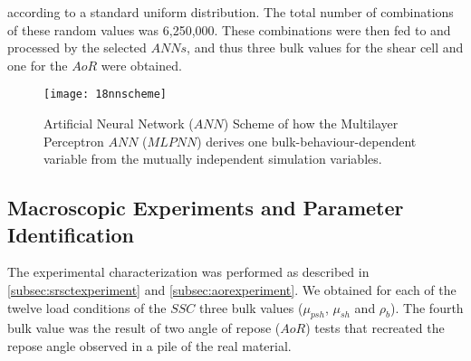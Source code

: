 \documentclass[review]{elsarticle}
\begin{document}
according to a standard uniform distribution.
The total number of combinations of these random values was 6,250,000.
These combinations were then fed to and processed by the selected
$ANNs$, and thus three bulk values for the shear
cell and one for the $AoR$ were obtained.
\begin{figure}[!htb] 
\centering 
\texttt{[image: 18nnscheme]} 
\caption[ANN Scheme]{Artificial Neural Network ($ANN$) Scheme
of how the Multilayer Perceptron $ANN$ ($MLPNN$) derives one
bulk-behaviour-dependent variable from the mutually independent simulation variables.}
\label{fig:18nnscheme} 
\end{figure}

\subsection{Macroscopic Experiments and Parameter Identification}
\label{subsec:macroscopicexperimentsparameteridentification}
The experimental characterization was performed as described in
\ref{subsec:srsctexperiment} and \ref{subsec:aorexperiment}. 
We obtained for each of the twelve load conditions of the $SSC$ three bulk
values ($\mu_{psh}$, $\mu_{sh}$ and $\rho_b$).
The fourth bulk value was the result of two angle of repose ($AoR$) tests that
recreated the repose angle observed in a pile of the
real material. 
\end{document}

